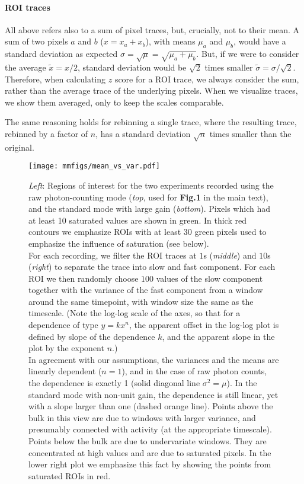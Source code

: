 \documentclass[a4paper,11pt,oneside,]{article}
\begin{document}
\paragraph{ROI traces}
All above refers also to a sum of pixel traces, but, crucially, not to their mean. A sum of two pixels $a$ and $b$ ($x=x_a+x_b$), with means $\mu_a$ and $\mu_b$, would have a standard deviation as expected $\sigma = \sqrt{\mu} = \sqrt{\mu_a+\mu_b}$. But, if we were to consider the average $\tilde x = x/2$, standard deviation would be $\sqrt{2}$ times smaller $\tilde \sigma = \sigma/\sqrt{2}$.
Therefore, when calculating $z$ score for a ROI trace, we always consider the sum, rather than the average trace of the underlying pixels. When we visualize traces, we show them averaged, only to keep the scales comparable.

The same reasoning holds for rebinning a single trace, where the resulting trace, rebinned by a factor of $n$,  has a standard deviation $\sqrt{n}$ times smaller than the original.


\begin{figure}[t]
 \centering
 \texttt{[image: mmfigs/mean\_vs\_var.pdf]}
 \caption{
 {\it Left}: Regions of interest for the two experiments recorded using the raw photon-counting mode ({\it top}, used for {\bf \color{red} Fig.1} in the main text), and the standard mode with large gain ({\it bottom}). Pixels which had at least 10 saturated values are shown in green. In thick red contours we emphasize ROIs with at least 30 green pixels used to emphasize the influence of saturation (see below).
 \\
 For each recording, we filter the ROI traces at $1$s ({\it middle}) and $10$s ({\it right}) to separate the trace into slow and fast component. For each ROI we then randomly choose $100$ values of the slow component together with the variance of the fast component from a window around the same timepoint, with window size the same as the timescale. 
 (Note the log-log scale of the axes, so that for a dependence of type $y=kx^n$, the apparent offset in the log-log plot is defined by slope of the dependence $k$, and the apparent slope in the plot by the exponent $n$.)
 \\
In agreement with our assumptions, the variances and the means are linearly dependent ($n=1$), and in the case of raw photon counts, the dependence is exactly 1 (solid diagonal line $\sigma^2=\mu$). In the standard mode with non-unit gain, the dependence is still linear, yet with a slope larger than one (dashed orange line). Points above the bulk in this view are due to windows with larger variance, and presumably connected with activity (at the appropriate timescale). Points below the bulk are due to undervariate windows. They are concentrated at high values and are due to saturated pixels. In the lower right plot we emphasize this fact by showing the points from saturated ROIs in red.
 }
 \label{fig:mean_vs_var}
\end{figure}
\end{document}
